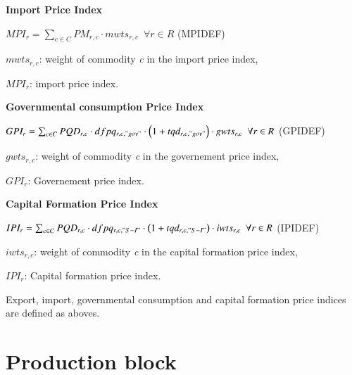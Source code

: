 \documentclass[10pt,a4paper,titlepage,dvipdfmx]{book}
\begin{document}
\begin{flushleft}\textbf{Import Price Index}\end{flushleft}


\begin{center}$MPI_{r}=\sum _{c\in C}PM_{r,c}\cdot mwts_{r,c}\,\,\,\forall r\in R$ (MPIDEF)
\end{center}

\begin{flushleft}

$mwts_{r,c}$: weight of commodity \textit{c} in the import price index,

$MPI_{r}$: import price index.
\end{flushleft}

\begin{flushleft}\textbf{Governmental consumption Price Index}\end{flushleft}


\begin{center}$GPI_{r}=\sum _{c\in C}PQD_{r,c}\cdot dfpq_{r,c,"gov"}\cdot \left(1+tqd_{r,c,"gov"}\right)\cdot gwts_{r,c}\,\,\,\forall r\in R$ (GPIDEF)
\end{center}

\begin{flushleft}

$gwts_{r,c}$: weight of commodity \textit{c} in the governement price index,

$GPI_{r}$: Governement price index.
\end{flushleft}

\begin{flushleft}\textbf{Capital Formation Price Index}\end{flushleft}


\begin{center}$IPI_{r}=\sum _{c\in C}PQD_{r,c}\cdot dfpq_{r,c,"S-I"}\cdot \left(1+tqd_{r,c,"S-I"}\right)\cdot iwts_{r,c}\,\,\,\forall r\in R$ (IPIDEF)
\end{center}

\begin{flushleft}
$iwts_{r,c}$: weight of commodity \textit{c} in the capital formation price index,

$IPI_{r}$: Capital formation price index.
\end{flushleft}

Export, import, governmental consumption and capital formation price indices are defined as aboves. 

\section{\label{sec:ProBlo}Production block}
\end{document}
